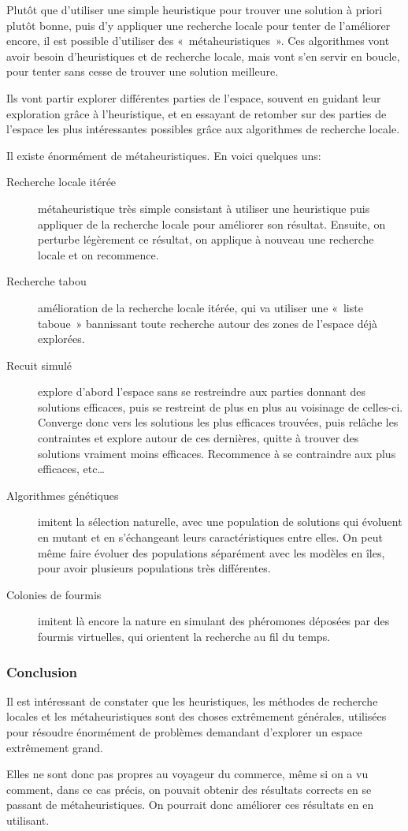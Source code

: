   Plutôt que d'utiliser une simple heuristique pour trouver une solution à priori plutôt
  bonne, puis d'y appliquer une recherche locale pour tenter de l'améliorer encore,
  il est possible d'utiliser des «~métaheuristiques~».
  Ces algorithmes vont avoir besoin d'heuristiques et de recherche locale, mais vont
  s'en servir en boucle, pour tenter sans cesse de trouver une solution meilleure.

  Ils vont partir explorer différentes parties de l'espace, souvent en guidant
  leur exploration grâce à l'heuristique, et en essayant de retomber sur des
  parties de l'espace les plus intéressantes possibles grâce aux algorithmes de
  recherche locale.

  Il existe énormément de métaheuristiques. En voici quelques uns:
  \begin{description}
  \item[Recherche locale itérée] métaheuristique très simple consistant à
    utiliser une heuristique puis appliquer de la recherche locale pour
    améliorer son résultat.  Ensuite, on perturbe légèrement ce résultat, on
    applique à nouveau une recherche locale et on recommence.
  \item[Recherche tabou] amélioration de la recherche locale itérée, qui va
    utiliser une «~liste taboue~» bannissant toute recherche autour des zones de
    l'espace déjà explorées.
  \item[Recuit simulé] explore d'abord l'espace sans se restreindre aux parties
    donnant des solutions efficaces, puis se restreint de plus en plus au
    voisinage de celles-ci. Converge donc vers les solutions les plus efficaces
    trouvées, puis relâche les contraintes et explore autour de ces dernières,
    quitte à trouver des solutions vraiment moins efficaces. Recommence à se
    contraindre aux plus efficaces, etc\dots
  \item[Algorithmes génétiques] imitent la sélection naturelle, avec une
    population de solutions qui évoluent en mutant et en s'échangeant leurs
    caractéristiques entre elles. On peut même faire évoluer des populations
    séparément avec les modèles en îles, pour avoir plusieurs populations très
    différentes.
  \item[Colonies de fourmis] imitent là encore la nature en simulant des
    phéromones déposées par des fourmis virtuelles, qui orientent la recherche
    au fil du temps.
  \end{description}

  \subsubsection{Conclusion}
    Il est intéressant de constater que les heuristiques, les méthodes de
    recherche locales et les métaheuristiques sont des choses extrêmement
    générales, utilisées pour résoudre énormément de problèmes demandant
    d'explorer un espace extrêmement grand.

    Elles ne sont donc pas propres au voyageur du commerce, même si on a vu
    comment, dans ce cas précis, on pouvait obtenir des résultats corrects en
    se passant de métaheuristiques. On pourrait donc améliorer ces résultats en
    en utilisant.

